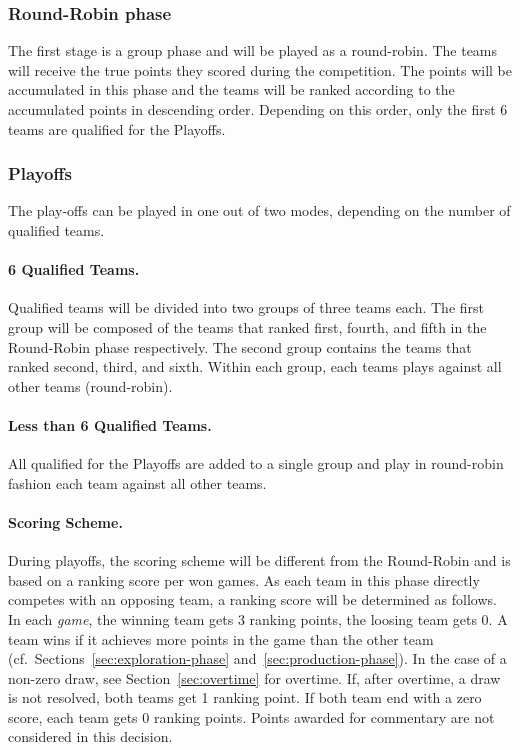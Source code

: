 \documentclass[12pt,twoside]{article}
\newcommand{\refsec}[1]{Section~\ref{#1}}
\begin{document}
\subsubsection{Round-Robin phase}
The first stage is a group phase and will be played as a round-robin. The teams
will receive the true points they scored during the competition. The points will
be accumulated in this phase and the teams will be ranked according to the
accumulated points in descending order. Depending on this order, only the first
6 teams are qualified for the Playoffs.

\subsubsection{Playoffs}
The play-offs can be played in one out of two modes, depending on the number of
qualified teams.

\paragraph{6 Qualified Teams.~}
Qualified teams will be divided into two groups of three teams each. The first
group will be composed of the teams that ranked first, fourth, and fifth in the
Round-Robin phase respectively. The second group contains the teams that ranked
second, third, and sixth. Within each group, each teams plays against all other
teams (round-robin).

\paragraph{Less than 6 Qualified Teams.~}
All qualified for the Playoffs are added to a single group and play in
round-robin fashion each team against all other teams.

\paragraph{Scoring Scheme.~}
During playoffs, the scoring scheme will be different from the Round-Robin and
is based on a ranking score per won games. As each team in this phase directly
competes with an opposing team, a ranking score will be determined as
follows. In each \emph{game}, the winning team gets 3 ranking points, the
loosing team gets 0. A team wins if it achieves more points in the game than the
other team (cf.~Sections~\ref{sec:exploration-phase}
and~\ref{sec:production-phase}).  In the case of a non-zero draw, see
\refsec{sec:overtime} for overtime.  If, after overtime, a draw is not resolved,
both teams get 1 ranking point. If both team end with a zero score, each team
gets 0 ranking points. Points awarded for commentary are not considered in this
decision.
\end{document}
